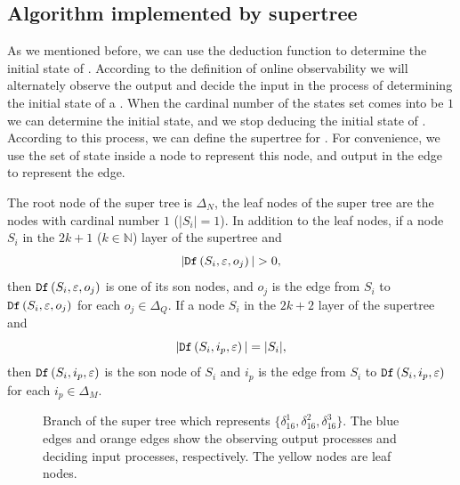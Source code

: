 \subsection{Algorithm implemented by supertree} As we mentioned before, we can use the deduction function to determine the initial state of \BCNs. According to the definition of online observability we will alternately observe the output and decide the input in the process of determining the initial state of a \BCN. When the  cardinal number of the states set comes into be $1$ we can determine the initial state, and we stop deducing the initial state of \BCNs. According to this process, we can define the supertree for \BCNs. For convenience, we use the set of state inside a node to represent this node, and output in the edge to represent the edge.
\begin{definition}
The root node of the super tree is $\Delta_N$, the leaf nodes of the super tree are the nodes with cardinal number $1$ ($|S_i|=1$). In addition to the leaf nodes, if a node $S_i$ in the $2k + 1$ ($k\in \mathbb{N}$) layer of the supertree and 
\[|\Ded\left(S_i,\varepsilon, o_j\right)|>0,\]
 then ${\tt Df}\left(S_i,\varepsilon, o_j\right)$ is one of its son nodes, and $o_j$ is the edge from $S_i$ to ${\tt Df}\left(S_i,\varepsilon, o_j\right)$ for each $o_j \in \Delta_Q$. If a node $S_i$ in the $2k+2$ layer of the supertree and  
\[|{\tt Df}\left(S_i,i_p,\varepsilon\right)|=|S_i|,\] 
then ${\tt Df}\left(S_i,i_p,\varepsilon\right)$ is the son node of $S_i$ and $i_p$ is the edge from $S_i$ to ${\tt Df}\left(S_i,i_p,\varepsilon\right)$ for each $i_p \in \Delta_M$. 
\label{def:super-tree}
\end{definition}

  \begin{figure}[thpb]
      \centering
      
      \caption{Branch of the super tree which represents $\{\delta_{16}^1,\delta_{16}^2,\delta_{16}^3\}$. The blue edges and orange edges show the observing output processes and deciding input processes, respectively. The yellow nodes are leaf nodes.}
      \label{fig:3}
   \end{figure}

